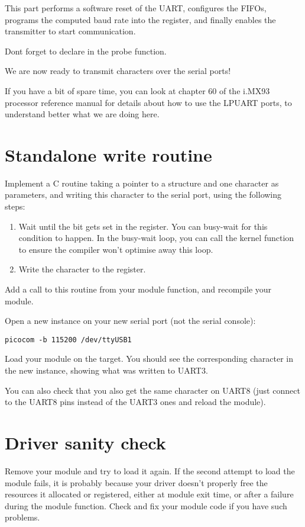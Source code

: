 This part performs a software reset of the UART, configures the FIFOs,
programs the computed baud rate into the register, and finally enables
the transmitter to start communication.

Dont forget to declare  in the probe function.

We are now ready to transmit characters over the serial ports!

If you have a bit of spare time, you can look at chapter 60 of the
i.MX93 processor reference manual for details about how to use the LPUART ports, to understand
better what we are doing here.

\section{Standalone write routine}

Implement a C routine taking a pointer to a 
structure and one character as parameters, and writing
this character to the serial port, using the following steps:

\begin{enumerate}
\item Wait until the  bit gets set in the
   register. You can busy-wait for this condition to happen.
  In the busy-wait loop, you can call the  kernel function
  to ensure the compiler won't optimise away this loop.
\item Write the character to the  register.
\end{enumerate}

Add a call to this routine from your module  function,
and recompile your module.

Open a new  instance on your new serial port (not the
serial console):

\begin{verbatim}
picocom -b 115200 /dev/ttyUSB1
\end{verbatim}

Load your module on the target. You should see the
corresponding character in the new  instance,
showing what was written to UART3.

You can also check that you also get the same character on UART8 (just connect
to the UART8 pins instead of the UART3 ones and reload the module).

\section{Driver sanity check}

Remove your module and try to load it again. If the second attempt to
load the module fails, it is probably because your driver doesn't
properly free the resources it allocated or registered, either at module
exit time, or after a failure during the module  function. Check
and fix your module code if you have such problems.
